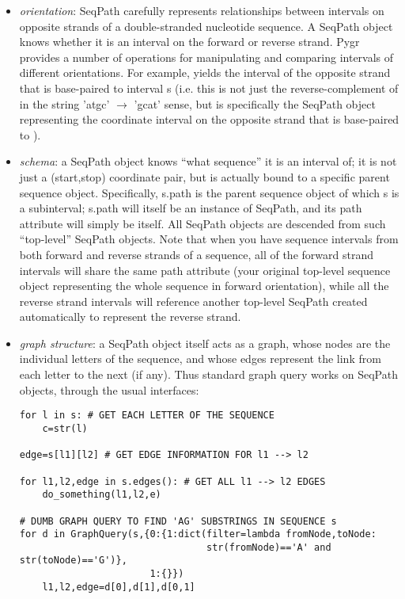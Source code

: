 \documentclass{howto}
\begin{document}
\begin{itemize}
\item
{\em orientation}: SeqPath carefully represents relationships between intervals
on opposite strands of a double-stranded nucleotide sequence.  A SeqPath object
knows whether it is an interval on the forward or reverse strand.  Pygr provides
a number of operations for manipulating and comparing intervals of different
orientations.  For example,  yields the interval of the opposite strand that
is base-paired to interval s (i.e. this is not just the reverse-complement of 
in the string 'atgc' $\rightarrow$ 'gcat' sense, but is specifically the SeqPath
object representing the coordinate
interval on the opposite strand that is base-paired to ).

\item
{\em schema}: a SeqPath object knows ``what sequence'' it is an interval of;
it is not just a (start,stop) coordinate pair, but is actually bound to a specific
parent sequence object.  Specifically, s.path is the parent sequence object of
which s is a subinterval; s.path will itself be an instance of SeqPath, and its path
attribute will simply be itself.  All SeqPath objects are descended from such ``top-level''
SeqPath objects.  Note that when you have sequence intervals from both forward
and reverse strands of a sequence, all of the forward strand intervals will share
the same path attribute (your original top-level sequence object representing
the whole sequence in forward orientation), while all the reverse strand intervals
will reference another top-level SeqPath created automatically to represent the
reverse strand.

\item
{\em graph structure}: a SeqPath object itself acts as a graph, whose nodes are
the individual letters of the sequence, and whose edges represent the link 
from each letter to the next (if any).  Thus standard graph query works on
SeqPath objects, through the usual interfaces:

\begin{verbatim}
for l in s: # GET EACH LETTER OF THE SEQUENCE
    c=str(l)

edge=s[l1][l2] # GET EDGE INFORMATION FOR l1 --> l2

for l1,l2,edge in s.edges(): # GET ALL l1 --> l2 EDGES
    do_something(l1,l2,e)

# DUMB GRAPH QUERY TO FIND 'AG' SUBSTRINGS IN SEQUENCE s
for d in GraphQuery(s,{0:{1:dict(filter=lambda fromNode,toNode:
                                 str(fromNode)=='A' and str(toNode)=='G')},
                       1:{}})
    l1,l2,edge=d[0],d[1],d[0,1]
\end{verbatim}  


\end{itemize}
\end{document}
